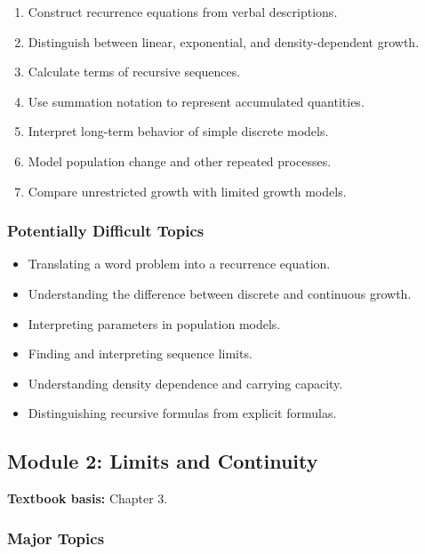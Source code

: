 \documentclass[11pt]{article}
\begin{document}
\begin{enumerate}[label=\arabic*.]
    \item Construct recurrence equations from verbal descriptions.
    \item Distinguish between linear, exponential, and density-dependent growth.
    \item Calculate terms of recursive sequences.
    \item Use summation notation to represent accumulated quantities.
    \item Interpret long-term behavior of simple discrete models.
    \item Model population change and other repeated processes.
    \item Compare unrestricted growth with limited growth models.
\end{enumerate}

\subsubsection*{Potentially Difficult Topics}

\begin{itemize}
    \item Translating a word problem into a recurrence equation.
    \item Understanding the difference between discrete and continuous growth.
    \item Interpreting parameters in population models.
    \item Finding and interpreting sequence limits.
    \item Understanding density dependence and carrying capacity.
    \item Distinguishing recursive formulas from explicit formulas.
\end{itemize}

\subsection{Module 2: Limits and Continuity}

\textbf{Textbook basis:} Chapter 3.

\subsubsection*{Major Topics}
\end{document}
